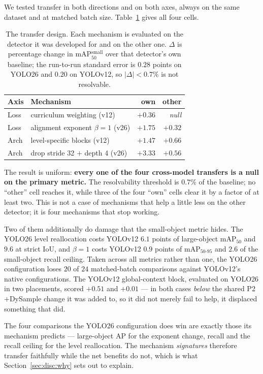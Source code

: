 \documentclass[10pt,twocolumn,a4paper]{article}
\begin{document}
We tested transfer in both directions and on both axes, always on the same
dataset and at matched batch size. Table~\ref{tab:transfer} gives all four cells.

\begin{table}[t]
\centering
\caption{The transfer design. Each mechanism is evaluated on the detector it was
developed for and on the other one. $\Delta$ is percentage change in
mAP$_{50}^{\text{small}}$ over that detector's own baseline; the run-to-run
standard error is $0.28$ points on YOLO26 and $0.20$ on YOLOv12, so
$|\Delta| < 0.7\%$ is not resolvable.}
\label{tab:transfer}
\small
\begin{tabular}{@{}llrr@{}}
\toprule
Axis & Mechanism & own & other \\
\midrule
Loss & curriculum weighting \; (v12) & $+0.36$ & \textit{null} \\
Loss & alignment exponent $\beta{=}1$ \; (v26) & $+1.75$ & \textit{$+0.32$} \\
Arch & level-specific blocks \; (v12) & $+1.47$ & \textit{$+0.66$} \\
Arch & drop stride 32 $+$ depth 4 \; (v26) & $+3.33$ & \textit{$+0.56$} \\
\bottomrule
\end{tabular}
\end{table}

The result is uniform: \textbf{every one of the four cross-model transfers is a
null on the primary metric.} The resolvability threshold is $0.7\%$ of the
baseline; no ``other'' cell reaches it, while three of the four ``own'' cells
clear it by a factor of at least two. This is not a case of mechanisms that help a
little less on the other detector; it is four mechanisms that stop working.

Two of them additionally do damage that the small-object metric hides. The
YOLO26 level reallocation costs YOLOv12 $6.1$ points of large-object
mAP$_{50}$ and $9.6$ at strict IoU, and $\beta=1$ costs YOLOv12 $0.9$ points of
mAP$_{50\text{-}95}$ and $2.6$ of the small-object recall ceiling. Taken across
all metrics rather than one, the YOLO26 configuration loses $20$ of $24$
matched-batch comparisons against YOLOv12's native configurations. The
YOLOv12 global-context block, evaluated on YOLO26 in two placements, scored
$+0.51$ and $+0.01$ --- in both cases \emph{below} the shared P2$+$DySample
change it was added to, so it did not merely fail to help, it displaced
something that did.

The four comparisons the YOLO26 configuration does win are exactly those its
mechanism predicts --- large-object AP for the exponent change, recall and the
recall ceiling for the level reallocation. The mechanism \emph{signatures}
therefore transfer faithfully while the net benefits do not, which is what
Section~\ref{sec:disc:why} sets out to explain.
\end{document}
